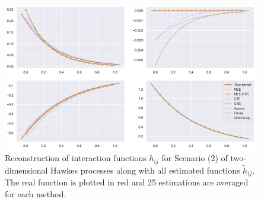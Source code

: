 \begin{subappendices}
  {\begin{figure}[!ht]
       \centering
       \includegraphics[width=\linewidth]{images/chapter3/reconstruction_param_2.pdf}
       \caption{Reconstruction of interaction functions $h_{ij}$ for Scenario (2) of two-dimensional Hawkes processes along with all estimated functions $\tilde h_{ij}$. The real function is plotted in red and 25 estimations are averaged for each method.}
       \label{fig_supp:scenario_2}
       \end{figure}}
\end{subappendices}